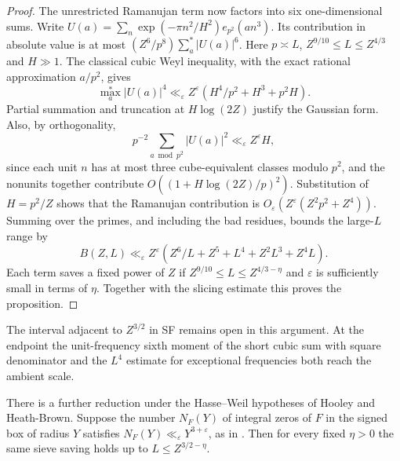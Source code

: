 \documentclass[11pt,letterpaper]{article}
\theoremstyle{definition}
\begin{document}
\begin{proof}
The unrestricted Ramanujan term now factors into six one-dimensional sums.
Write $U(a)=\sum_n\exp(-\pi n^2/H^2)e_{p^2}(an^3)$. Its contribution
in absolute value is at most $(Z^6/p^8)\sum_a^*|U(a)|^6$.
Here $p\asymp L$, $Z^{9/10}\le L\le Z^{4/3}$ and $H\gg1$.
The classical cubic Weyl inequality, with the exact rational approximation
$a/p^2$, gives
\[
 \max_a^*|U(a)|^4\ll_\varepsilon Z^\varepsilon
        (H^4/p^2+H^3+p^2H).
\]
Partial summation and truncation at $H\log(2Z)$ justify the Gaussian form.
Also, by orthogonality,
\[p^{-2}\sum_{a\bmod p^2}|U(a)|^2\ll_\varepsilon Z^\varepsilon H,\]
since each unit $n$ has at most three cube-equivalent classes
modulo $p^2$, and the nonunits together contribute
$O((1+H\log(2Z)/p)^2)$. Substitution of $H=p^2/Z$ shows that the
Ramanujan contribution is $O_\varepsilon(Z^\varepsilon(Z^2p^2+Z^4))$.
Summing over the primes, and including the bad residues, bounds the
large-$L$ range by
\[
 B(Z,L)\ll_\varepsilon Z^\varepsilon
      (Z^6/L+Z^5+L^4+Z^2L^3+Z^4L).
\]
Each term saves a fixed power of $Z$ if $Z^{9/10}\le L\le Z^{4/3-\eta}$
and $\varepsilon$ is sufficiently small in terms of $\eta$. Together with
the slicing estimate this proves the proposition.
\end{proof}
The interval adjacent to $Z^{3/2}$ in SF remains open in this argument.
At the endpoint the unit-frequency sixth moment of the short cubic sum
with square denominator and the $L^4$ estimate for exceptional frequencies
both reach the ambient scale.

There is a further reduction under the Hasse--Weil hypotheses of
Hooley and Heath-Brown. Suppose the number $N_F(Y)$ of integral zeros
of $F$ in the signed box of radius $Y$ satisfies
$N_F(Y)\ll_\varepsilon Y^{3+\varepsilon}$, as in
\cite[Theorem 1.4]{c3:wang}. Then for every fixed $\eta>0$ the same
sieve saving holds up to $L\le Z^{3/2-\eta}$.
\end{document}
